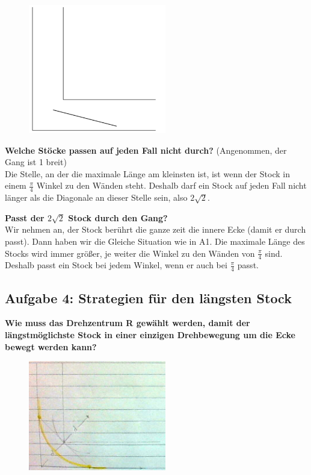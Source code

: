 \documentclass[a4paper,11pt]{article}
\begin{document}
\begin{figure}[htbp] 
        \centering
        \includegraphics[width=6cm]{img/A3_1.png}
\end{figure}

\textbf{Welche St\"ocke passen auf jeden Fall nicht durch?} (Angenommen, der Gang ist 1 breit) \\
Die Stelle, an der die maximale Länge am kleinsten ist, ist wenn der Stock in einem $\frac{\pi}{4}$ Winkel zu den Wänden steht. Deshalb darf ein Stock auf jeden Fall nicht länger als die Diagonale an dieser Stelle sein, also $2\sqrt{2}$.

\textbf{Passt der $2\sqrt{2}$ Stock durch den Gang?} \\
Wir nehmen an, der Stock berührt die ganze zeit die innere Ecke (damit er durch passt). Dann haben wir die Gleiche Situation wie in A1. Die maximale Länge des Stocks wird immer größer, je weiter die Winkel zu den Wänden von $\frac{\pi}{4}$ sind. Deshalb passt ein Stock bei jedem Winkel, wenn er auch bei $\frac{\pi}{4}$ passt.

\subsection{Aufgabe 4: Strategien f\"ur den l\"angsten Stock}
\textbf{Wie muss das Drehzentrum R gew\"ahlt werden, damit der l\"angstm\"oglichste Stock in einer einzigen Drehbewegung um die Ecke bewegt werden kann?} \\

\begin{figure}[htbp] 
        \centering
        \includegraphics[width=6cm]{img/A4_1.png}
\end{figure}
\end{document}
